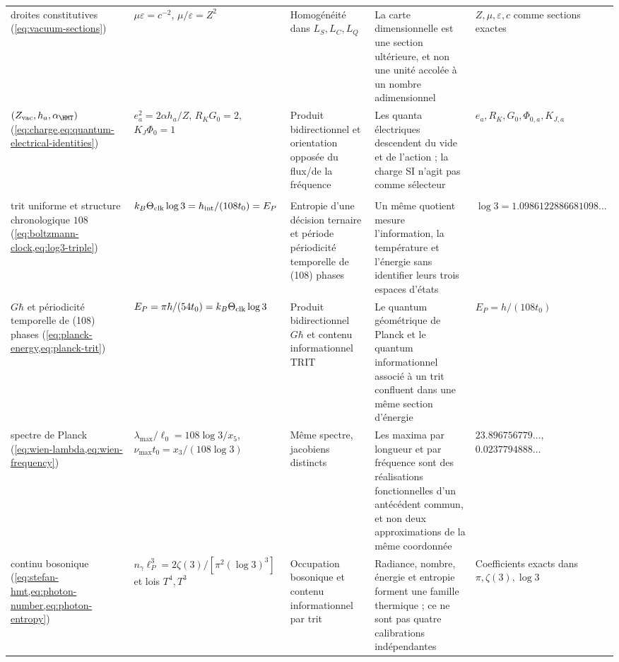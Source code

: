 \begin{longtable}{@{}
>{\raggedright\arraybackslash}p{25mm}
>{\raggedright\arraybackslash}p{37mm}
>{\raggedright\arraybackslash}p{24mm}
>{\raggedright\arraybackslash}p{29mm}
>{\raggedright\arraybackslash}p{32mm}@{}}
droites constitutives
(\cref{eq:vacuum-sections}) &
\(\mu\varepsilon=c^{-2}\), \(\mu/\varepsilon=Z^2\) &
Homogénéité dans \(L_S,L_C,L_Q\) &
La carte dimensionnelle est une section ultérieure, et non une unité accolée à un
nombre adimensionnel &
\(Z,\mu,\varepsilon,c\) comme sections exactes\\

\((Z_{\rm vac},h_a,\alpha_{\HMT})\)
(\cref{eq:charge,eq:quantum-electrical-identities}) &
\(e_a^2=2\alpha h_a/Z\), \(R_KG_0=2\), \(K_J\Phi_0=1\) &
Produit bidirectionnel et orientation opposée du flux/de la fréquence &
Les quanta électriques descendent du vide et de l'action ; la charge SI
n'agit pas comme sélecteur &
\(e_a,R_K,G_0,\Phi_{0,a},K_{J,a}\)\\

\addlinespace
\multicolumn{5}{@{}l}{\bfseries III. Information, température et rayonnement}\\*
trit uniforme et structure chronologique \(108\)
(\cref{eq:boltzmann-clock,eq:log3-triple}) &
\(k_B\Theta_{\rm clk}\log3=h_{\rm int}/(108t_0)=E_P\) &
Entropie d'une décision ternaire et période périodicité temporelle de (108) phases &
Un même quotient mesure l'information, la température et l'énergie sans identifier
leurs trois espaces d'états &
\(\log3=1.0986122886681098\ldots\)\\

\(G\hbar\) et périodicité temporelle de (108) phases
(\cref{eq:planck-energy,eq:planck-trit}) &
\(E_P=\pi\hbar/(54t_0)=k_B\Theta_{\rm clk}\log3\) &
Produit bidirectionnel \(G\hbar\) et contenu informationnel TRIT &
Le quantum géométrique de Planck et le quantum informationnel associé à un trit
confluent dans une même section d'énergie &
\(E_P=h/(108t_0)\)\\

spectre de Planck
(\cref{eq:wien-lambda,eq:wien-frequency}) &
\(\lambda_{\max}/\ell_0=108\log3/x_5\),
\(\nu_{\max}t_0=x_3/(108\log3)\) &
Même spectre, jacobiens distincts &
Les maxima par longueur et par fréquence sont des réalisations fonctionnelles d'un antécédent commun, et non deux
approximations de la même coordonnée &
\(23.896756779\ldots\), \(0.0237794888\ldots\)\\

continu bosonique
(\cref{eq:stefan-hmt,eq:photon-number,eq:photon-entropy}) &
\(n_\gamma\ell_P^3=2\zeta(3)/[\pi^2(\log3)^3]\) et lois \(T^4,T^3\) &
Occupation bosonique et contenu informationnel par trit &
Radiance, nombre, énergie et entropie forment une famille thermique ; ce ne
sont pas quatre calibrations indépendantes &
Coefficients exacts dans \(\pi,\zeta(3),\log3\)\\


\end{longtable}
